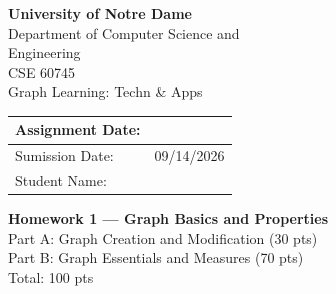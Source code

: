\documentclass[11pt,a4paper]{article}
\begin{document}
\begin{center}
\vspace*{1.8cm}

{\Huge\bfseries University of Notre Dame}\\[0.9cm]
{\LARGE Department of Computer Science and}\\[0.25cm]
{\LARGE Engineering}\\[1.8cm]

{\LARGE CSE 60745}\\[0.6cm]
{\LARGE Graph Learning: Techn \& Apps}\\[2.0cm]

\renewcommand{\arraystretch}{2.6}
\begin{tabular}{|p{}|p{}|}
\hline
Assignment Date: & \\ \hline
Sumission Date: & 09/14/2026 \\ \hline
Student Name: & \\ \hline
\end{tabular}

\vfill

{\large\bfseries Homework 1 --- Graph Basics and Properties}\\[0.35cm]
{\normalsize
Part A: Graph Creation and Modification (30 pts)\\
Part B: Graph Essentials and Measures (70 pts)\\[0.2cm]
Total: 100 pts}
\end{center}
\newpage



\clearpage


\clearpage

\end{document}
